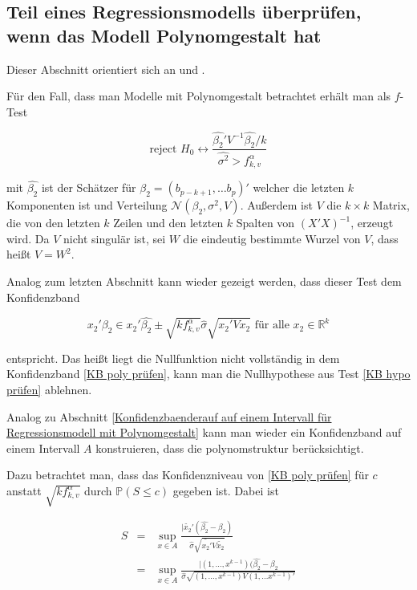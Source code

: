 \documentclass[12pt,a4paper]{article}
\theoremstyle{definition}
\theoremstyle{definition}
\theoremstyle{definition}
\theoremstyle{definition}
\begin{document}
\subsection{Teil eines Regressionsmodells überprüfen, wenn das Modell Polynomgestalt hat}
\label{Teil eines Regressionsmodells überpruefen, wenn das Modell Polynomgestalt hat}
Dieser Abschnitt orientiert sich an \cite[190-192]{Liu64} und \cite{Draper98}.

Für den Fall, dass man Modelle mit Polynomgestalt betrachtet erhält man als $f$-Test

\begin{equation}\label{KB hypo prüfen}
\text{reject } H_0 \leftrightarrow \frac{\hat{\beta_2}' V^{-1} \hat{\beta_2}/k}{\widehat{\sigma^2} > f^{\alpha}_{k,v}}
\end{equation}

mit $\hat{\beta_2}$ ist der Schätzer für $\beta_2=(b_{p-k+1}, \ldots b_{p})'$ welcher die letzten $k$ Komponenten ist und Verteilung $\mathscr{N}(\beta_2,\sigma^2,V)$. Außerdem ist $V$ die $k \times k$ Matrix, die von den letzten $k$ Zeilen und den letzten $k$ Spalten von $(X'X)^{-1}$, erzeugt wird. Da $V$ nicht singulär ist, sei $W$ die eindeutig bestimmte Wurzel von $V$, dass heißt $V=W^2$. 

Analog zum letzten Abschnitt kann wieder gezeigt werden, dass dieser Test dem Konfidenzband 

\begin{equation}\label{KB poly prüfen}
x_2' \beta_2 \in x_2' \hat{\beta_2} \pm \sqrt{k f^{\alpha}_{k,v}} \hat{\sigma} \sqrt{x_2' V x_2} \text{ für alle } x_2 \in \mathbb{R}^k
\end{equation}

entspricht. Das heißt liegt die Nullfunktion nicht vollständig in dem Konfidenzband \eqref{KB poly prüfen}, kann man die Nullhypothese aus Test \eqref{KB hypo prüfen} ablehnen.

Analog zu Abschnitt \ref{Konfidenzbaenderauf auf einem Intervall für Regressionsmodell mit Polynomgestalt} kann man wieder ein Konfidenzband auf einem Intervall $A$ konstruieren, dass die polynomstruktur berücksichtigt.

Dazu betrachtet man, dass das Konfidenzniveau von \eqref{KB poly prüfen} für $c$ anstatt $\sqrt{k f^{\alpha}_{k,v}}$ durch $\mathbb{P}(S\leq c)$ gegeben ist. Dabei ist

\begin{eqnarray*}
S &=& \sup_{x \in A} \frac{\vert \tilde{x_2}' (\hat{\beta_2}-\beta_2)}{\hat{\sigma} \sqrt{\tilde{x_2'}V\tilde{x_2}}} \\
&=& \sup_{x \in A} \frac{\vert (1, \ldots, x^{k-1})(\hat{\beta_2}-\beta_2}{\hat{\sigma} \sqrt{(1, \ldots, x^{k-1}) V (1, \ldots x^{k-1})'}}
\end{eqnarray*}
\end{document}
